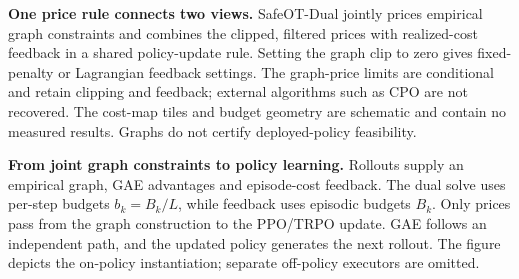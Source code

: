 \textbf{One price rule connects two views.} SafeOT-Dual jointly prices empirical
graph constraints and combines the clipped, filtered prices with realized-cost
feedback in a shared policy-update rule. Setting the graph clip to zero gives
fixed-penalty or Lagrangian feedback settings. The graph-price limits are conditional
and retain clipping and feedback; external algorithms such as CPO are not recovered.
The cost-map tiles and budget geometry are schematic and contain no measured
results. Graphs do not certify deployed-policy feasibility.

\textbf{From joint graph constraints to policy learning.} Rollouts supply an
empirical graph, GAE advantages and episode-cost feedback. The dual solve uses
per-step budgets $b_k=B_k/L$, while feedback uses episodic budgets $B_k$. Only
prices pass from the graph construction to the PPO/TRPO update. GAE follows an
independent path, and the updated policy generates the next rollout. The figure
depicts the on-policy instantiation; separate off-policy executors are omitted.
